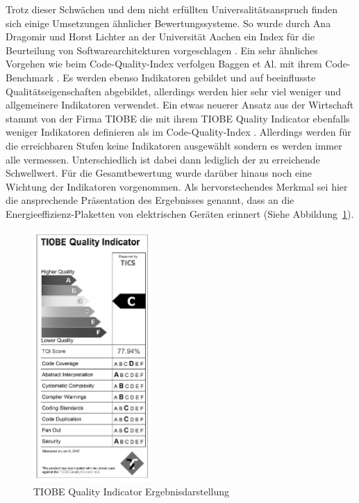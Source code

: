 \documentclass[da,ngerman]{stthesis}
\begin{document}
			Trotz dieser Schwächen und dem nicht erfüllten Universalitätsanspruch finden sich einige Umsetzungen ähnlicher Bewertungssysteme. So wurde durch Ana Dragomir und Horst Lichter an der Universität Aachen ein Index für die Beurteilung von Softwarearchitekturen vorgeschlagen \cite{ArchitectureIndex}. \newline
			Ein sehr ähnliches Vorgehen wie beim Code-Quality-Index verfolgen Baggen et Al. mit ihrem Code-Benchmark \cite{CodeBenchmark}. Es werden ebenso Indikatoren gebildet und auf beeinflusste Qualitätseigenschaften abgebildet, allerdings werden hier sehr viel weniger und allgemeinere Indikatoren verwendet. Ein etwas neuerer Ansatz aus der Wirtschaft stammt von der Firma TIOBE die mit ihrem TIOBE Quality Indicator ebenfalls weniger Indikatoren definieren als im Code-Quality-Index \cite{TIOBEIndex}. Allerdings werden für die erreichbaren Stufen keine Indikatoren ausgewählt sondern es werden immer alle vermessen. Unterschiedlich ist dabei dann lediglich der zu erreichende Schwellwert. Für die Gesamtbewertung wurde darüber hinaus noch eine Wichtung der Indikatoren vorgenommen. Als hervorstechendes Merkmal sei hier die ansprechende Präsentation des Ergebnisses genannt, dass an die Energieeffizienz-Plaketten von elektrischen Geräten erinnert (Siehe Abbildung~\ref{TIOBElabel}). \newline
			\begin{figure} [h]
				\centering
				\includegraphics [width=0.4\textwidth] {tiobe.png}
				\caption{TIOBE Quality Indicator Ergebnisdarstellung \cite{TIOBEIndex}}
				\label{TIOBElabel}
			\end{figure}
\end{document}
